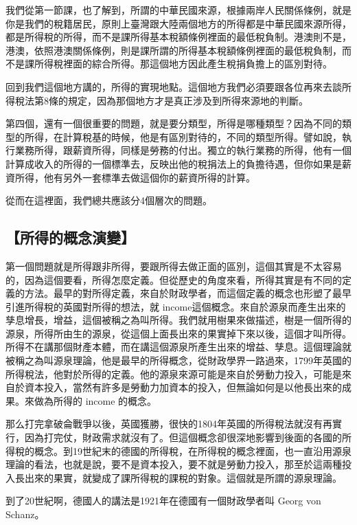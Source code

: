 \documentclass[oneside,sub3section]{ctexbook}
\begin{document}
我們從第一節課，也了解到，所謂的中華民國來源，根據兩岸人民關係條例，就是你是我們的稅籍居民，原則上臺灣跟大陸兩個地方的所得都是中華民國來源所得，都是所得稅的所得，而不是課所得基本稅額條例裡面的最低稅負制。港澳則不是，港澳，依照港澳關係條例，則是課所謂的所得基本稅額條例裡面的最低稅負制，而不是課所得稅裡面的綜合所得。那這個地方因此產生稅捐負擔上的區別對待。

回到我們這個地方講的，所得的實現地點。這個地方我們必須要跟各位再來去談所得稅法第8條的規定，因為那個地方才是真正涉及到所得來源地的判斷。

第四個，還有一個很重要的問題，就是要分類型，所得是哪種類型？因為不同的類型的所得，在計算稅基的時候，他是有區別對待的，不同的類型所得。譬如說，執行業務所得，跟薪資所得，同樣是勞務的付出。獨立的執行業務的所得，他有一個計算成收入的所得的一個標準去，反映出他的稅捐法上的負擔待遇，但你如果是薪資所得，他有另外一套標準去做這個你的薪資所得的計算。

從而在這裡面，我們總共應該分4個層次的問題。

\hypertarget{ux6240ux5f97ux7684ux6982ux5ff5ux6f14ux8b8a}{%
\subsection{【所得的概念演變】}\label{ux6240ux5f97ux7684ux6982ux5ff5ux6f14ux8b8a}}

第一個問題就是所得跟非所得，要跟所得去做正面的區別，這個其實是不太容易的，因為這個要看，所得怎麼定義。但從歷史的角度來看，所得其實是有不同的定義的方法。最早的對所得定義，來自於財政學者，而這個定義的概念也形塑了最早引進所得稅的英國對所得的想法，就 income這個概念。來自於源泉而產生出來的孳息增長，增益，這個被稱之為叫所得。我們就用樹果來做描述，樹是一個所得的源泉，所得所由生的源泉，從這個上面長出來的果實掉下來以後，這個才叫所得。所得不在講那個財產本體，而在講這個源泉所產生出來的增益、孳息。這個理論就被稱之為叫源泉理論，他是最早的所得概念，從財政學界一路過來，1799年英國的所得稅法，他對於所得的定義。他的源泉來源可能是來自於勞動力投入，可能是來自於資本投入，當然有許多是勞動力加資本的投入，但無論如何是以他長出來的成果。來做為所得的 income 的概念。

那么打完拿破侖戰爭以後，英國獲勝，很快的1804年英國的所得稅法就沒有再實行，因為打完仗，財政需求就沒有了。但這個概念卻很深地影響到後面的各國的所得稅的概念。到19世紀末的德國的所得稅，在所得稅的概念裡面，也一直沿用源泉理論的看法，也就是說，要不是資本投入，要不就是勞動力投入，那至於這兩種投入長出來的果實，就變成了課所得稅的課稅的對象。這個就是所謂的源泉理論。

到了20世紀啊，德國人的講法是1921年在德國有一個財政學者叫 Georg von Schanz。
\end{document}
